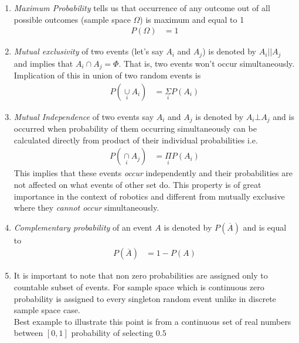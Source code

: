 \documentclass[12pt]{report} %
\begin{document}
	\begin{enumerate}
		\item \textit{Maximum Probability} tells us that occurrence of any outcome out of all possible outcomes (sample space $\Omega$) is maximum and equal to 1
		\begin{align}
			P(\Omega) &= 1
		\end{align}
		\item  \textit{Mutual exclusivity} of two events (let's say $A_i$ and $A_j$) is denoted by $A_i || A_j$ and implies that $A_i \cap A_j = \Phi$. That is, two events won't occur simultaneously. Implication of this in union of two random events is 		
		\begin{align}
			P(\underset{i}{\cup}A_i) &= \underset{i}{\Sigma}P(A_i)
		\end{align}
		\item \textit{Mutual Independence} of two events say $A_i$ and $A_j$ is denoted by $A_i \bot A_j$ and is occurred when probability of them occurring simultaneously can be calculated directly from product of their individual probabilities i.e.
		\begin{align}
			P(\underset{i}{\cap}A_j) &= \underset{i}{\Pi} P(A_i) 
		\end{align}
		This implies that these events \textit{occur} independently and their probabilities are not affected on what events of other set do. This property is of great importance in the context of robotics and different from mutually exclusive where they \textit{cannot occur} simultaneously. 
		\item \textit{Complementary  probability} of an event $A$ is denoted by $P(\overline{A})$ and is equal to 
		\begin{align}
			P(\overline{A}) &= 1 - P(A) 
		\end{align}
		\item It is important to note that non zero probabilities are assigned only to countable subset of events. For sample space which is continuous zero probability is assigned to every singleton random event unlike in discrete sample space case.\\
		Best example to illustrate this point is from a continuous set of real numbers between $[0,1]$ probability of selecting $0.5$ 
	\end{enumerate}
	
\end{document}
